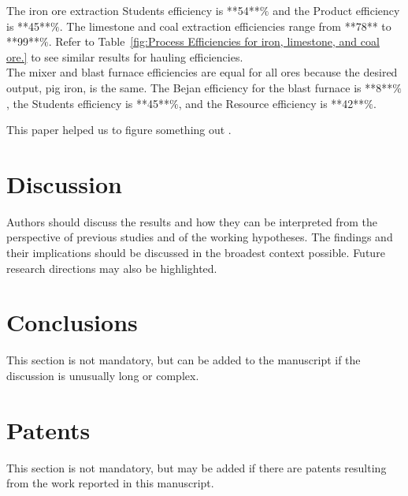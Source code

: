 \documentclass[energies,article,submit,pdftex,moreauthors]{Definitions/mdpi}
\begin{document}
The iron ore extraction Students efficiency is **54**$\%$
and the Product efficiency is **45**$\%$.
The limestone and coal extraction efficiencies range
from **78** to **99**$\%$.
Refer to Table~\ref{fig:Process Efficiencies for iron, limestone, and coal ore.}
to see similar results
for hauling efficiencies.\\
The mixer and blast furnace efficiencies
are equal for all ores because the desired output, pig iron, is the same.
The Bejan efficiency for the blast furnace
is **8**$\%$,
the Students efficiency is **45**$\%$,
and the Resource efficiency is **42**$\%$.




This paper helped us to figure something out
.



\section{Discussion}
\label{discussion}

Authors should discuss the results and how they can be interpreted from the perspective of previous studies and of the working hypotheses. The findings and their implications should be discussed in the broadest context possible. Future research directions may also be highlighted.

\section{Conclusions}

This section is not mandatory, but can be added to the manuscript if the discussion is unusually long or complex.

\section{Patents}

This section is not mandatory, but may be added if there are patents resulting from the work reported in this manuscript.

\vspace{6pt}
\end{document}
